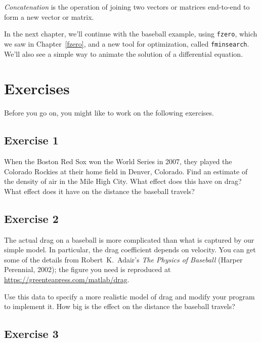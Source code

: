 \emph{Concatenation} is the operation of joining two vectors or matrices end-to-end to
form a new vector or matrix.

In the next chapter, we'll continue with the baseball example, using \lstinline{fzero}, which we saw in Chapter~\ref{fzero}, and a new tool for optimization, called \lstinline{fminsearch}.  We'll also see a simple way to animate the solution of a differential equation.


\section{Exercises}

Before you go on, you might like to work on the following exercises.

\subsection{Exercise 1}


When the Boston Red Sox won the World Series in 2007, they played the
Colorado Rockies at their home field in Denver, Colorado.  Find an
estimate of the density of air in the Mile High City.  What effect
does this have on drag?  What effect does it have on the distance the baseball travels?

\subsection{Exercise 2}


The actual drag on a baseball is more complicated than what is
captured by our simple model.  In particular, the drag coefficient
depends on velocity.  You can get some of the details from Robert~K.\ Adair's \emph{The
Physics of Baseball} (Harper Perennial, 2002); the figure you need is reproduced at \url{https://greenteapress.com/matlab/drag}.

Use this data to specify a more realistic model of drag and modify your
program to implement it.  How big is the effect on the distance the baseball travels?


\subsection{Exercise 3}
\label{cannon}


